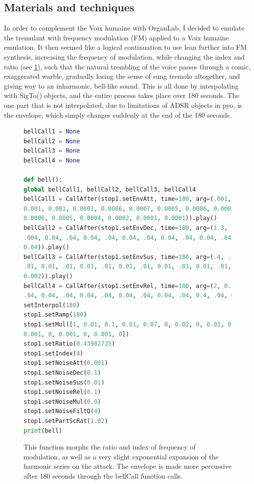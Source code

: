 \documentclass[12pt,twoside,maitrise]{dms_ks}
\theoremstyle{definition}
\begin{document}
{\subsection{Materials and techniques}

In order to complement the Voix humaine with OrganLab, I decided to emulate the tremulant with frequency modulation (FM) applied to a Voix humaine emulation.  
It then seemed like a logical continuation to use lean further into FM synthesis, increasing the frequency of modulation, while changing the index and ratio (see \cref{fig:fm}), such that the natural trembling of the voice passes through a comic, exaggerated warble, gradually losing the sense of sung tremolo altogether, and giving way to an inharmonic, bell-like sound.  
This is all done by interpolating with SigTo() objects, and the entire process takes place over 180 seconds.  
The one part that is not interpolated, due to limitations of ADSR objects in pyo, is the envelope, which simply changes suddenly at the end of the 180 seconds.

\begin{figure}[H]  
\begin{lstlisting}[language=Python]  
bellCall1 = None  
bellCall2 = None  
bellCall3 = None  
bellCall4 = None

def bell():  
global bellCall1, bellCall2, bellCall3, bellCall4  
bellCall1 = CallAfter(stop1.setEnvAtt, time=180, arg=(.001, .001, .001, .001, 
0.001, 0.001, 0.0001, 0.0006, 0.0007, 0.0005, 0.0006, 0.0003, 0.0005, 0.0003, 
0.0006, 0.0005, 0.0004, 0.0002, 0.0001, 0.0001)).play()  
bellCall2 = CallAfter(stop1.setEnvDec, time=180, arg=(1.3, .05, .02, 0, 0, 0.04, 
.004, 0.04, .04, 0.04, .04, 0.04, .04, 0.04, .04, 0.04, .04, 0.04, .04, 
0.04)).play()  
bellCall3 = CallAfter(stop1.setEnvSus, time=180, arg=(.4, .1, .02, .01, .01, 0.01, 
.01, 0.01, .01, 0.01, .01, 0.01, .01, 0.01, .01, 0.01, .01, 0.01, .002, 
0.002)).play()  
bellCall4 = CallAfter(stop1.setEnvRel, time=180, arg=(2, 0.1, 0.1, .01, .03, 0.4, 
.04, 0.04, .04, 0.04, .04, 0.04, .04, 0.04, .04, 0.4, .04, 0.04, .04, 0.4)).play()  
setInterpol(180)  
stop1.setRamp(180)  
stop1.setMul([1, 0.01, 0.1, 0.01, 0.07, 0, 0.02, 0, 0.01, 0, 0.003, 0, 0.003, 0, 
0.001, 0, 0.001, 0, 0.001, 0])  
stop1.setRatio(0.43982735)  
stop1.setIndex(4)  
stop1.setNoiseAtt(0.001)  
stop1.setNoiseDec(0.1)  
stop1.setNoiseSus(0.01)  
stop1.setNoiseRel(0.1)  
stop1.setNoiseMul(0.9)  
stop1.setNoiseFiltQ(4)  
stop1.setPartScRat(1.02)  
print(bell)  
\end{lstlisting}  
\caption{This function morphs the ratio and index of frequency of modulation, as well as a very slight exponential expansion of the harmonic series on the attack. The envelope is made more percussive after 180 seconds through the bellCall function calls.}  
\label{fig:fm}
\end{figure}

}
\end{document}
